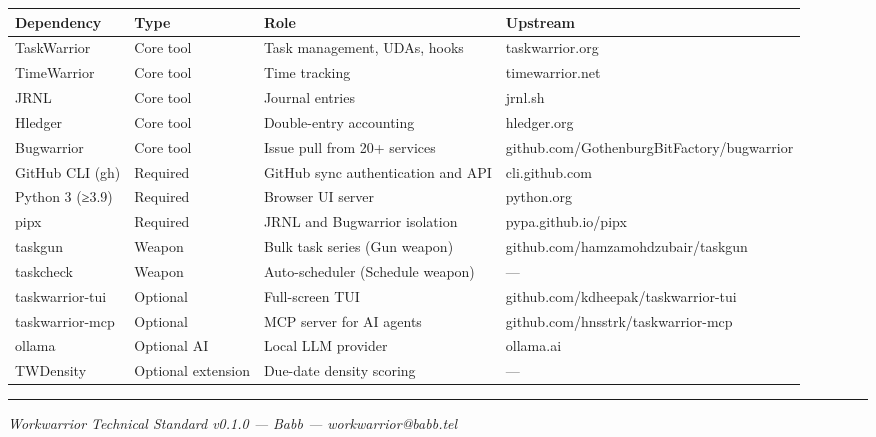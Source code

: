 \documentclass[
]{article}
\newcounter{none} %
\begin{document}
{\def\LTcaptype{none} %
\begin{longtable}[]{@{}
  >{\raggedright\arraybackslash}p{}
  >{\raggedright\arraybackslash}p{}
  >{\raggedright\arraybackslash}p{}
  >{\raggedright\arraybackslash}p{}@{}}
\toprule\noalign{}
\begin{minipage}[b]{\linewidth}\raggedright
Dependency
\end{minipage} & \begin{minipage}[b]{\linewidth}\raggedright
Type
\end{minipage} & \begin{minipage}[b]{\linewidth}\raggedright
Role
\end{minipage} & \begin{minipage}[b]{\linewidth}\raggedright
Upstream
\end{minipage} \\
\midrule\noalign{}
\endhead
\bottomrule\noalign{}
\endlastfoot
TaskWarrior & Core tool & Task management, UDAs, hooks &
taskwarrior.org \\
TimeWarrior & Core tool & Time tracking & timewarrior.net \\
JRNL & Core tool & Journal entries & jrnl.sh \\
Hledger & Core tool & Double-entry accounting & hledger.org \\
Bugwarrior & Core tool & Issue pull from 20+ services &
github.com/GothenburgBitFactory/bugwarrior \\
GitHub CLI (gh) & Required & GitHub sync authentication and API &
cli.github.com \\
Python 3 (≥3.9) & Required & Browser UI server & python.org \\
pipx & Required & JRNL and Bugwarrior isolation & pypa.github.io/pipx \\
taskgun & Weapon & Bulk task series (Gun weapon) &
github.com/hamzamohdzubair/taskgun \\
taskcheck & Weapon & Auto-scheduler (Schedule weapon) & --- \\
taskwarrior-tui & Optional & Full-screen TUI &
github.com/kdheepak/taskwarrior-tui \\
taskwarrior-mcp & Optional & MCP server for AI agents &
github.com/hnsstrk/taskwarrior-mcp \\
ollama & Optional AI & Local LLM provider & ollama.ai \\
TWDensity & Optional extension & Due-date density scoring & --- \\
\end{longtable}
}

\begin{center}\rule{0.5\linewidth}{0.5pt}\end{center}

\emph{Workwarrior Technical Standard v0.1.0 --- Babb ---
workwarrior@babb.tel}
\end{document}
